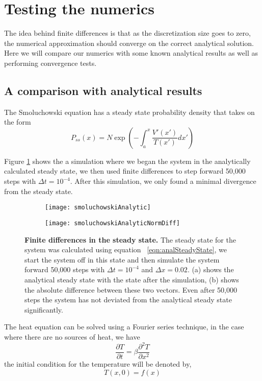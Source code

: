 \section{Testing the numerics}

The idea behind finite differences is that as the discretization size goes to zero, the numerical approximation should converge on the correct analytical solution. Here we will compare our numerics with some known analytical results as well as performing convergence tests.
\subsection{A comparison with analytical results}

The Smoluchowski equation has a steady state probability density that takes on the form
\begin{equation}
P_{ss}(x) = N \exp{\left(-\int_a^x \frac{V'(x')}{T(x')} dx' \right)} \label{eqn:analSteadyState}
\end{equation}

Figure \ref{fig:smoluchowskiCompare} shows the a simulation where we began the system in the analytically calculated steady state, we then used finite differences to step forward 50,000 steps with $\Delta t = 10^{-4}$. After this simulation, we only found a minimal divergence from the steady state.
\begin{figure}
	\begin{subfigure}{0.49\textwidth}
	\texttt{[image: smoluchowskiAnalytic]}
	\end{subfigure}
	\begin{subfigure}{0.49\textwidth}
	\texttt{[image: smoluchowskiAnalyticNormDiff]}
	\end{subfigure}
	\caption{\textbf{Finite differences in the steady state.} The steady state for the system was calculated using equation ~\ref{eqn:analSteadyState}, we start the system off in this state and then simulate the system forward 50,000 steps with $\Delta t = 10^{-4}$ and $\Delta x = 0.02$. (a) shows the analytical steady state with the state after the simulation, (b) shows the absolute difference between these two vectors. Even after 50,000 steps the system has not deviated from the analytical steady state significantly. \label{fig:smoluchowskiCompare}}
\end{figure}

The heat equation can be solved using a Fourier series technique, in the case where there are no sources of heat, we have
\begin{equation}
\frac{\partial T}{\partial t} = \beta \frac{\partial^2 T}{\partial x^2}
\end{equation}
the initial condition for the temperature will be denoted by,
\begin{equation}
T(x, 0) = f(x)
\end{equation}

